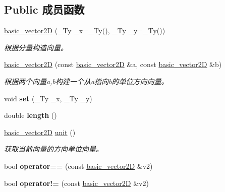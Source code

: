 \subsection*{Public 成员函数}
\begin{DoxyCompactItemize}
\item 
\hyperlink{structbasic__vector2_d_ad8b15c63d5ad6e86e1192ff820f53a67}{basic\+\_\+vector2D} (\+\_\+\+Ty \+\_\+x=\+\_\+\+Ty(), \+\_\+\+Ty \+\_\+y=\+\_\+\+Ty())
\begin{DoxyCompactList}\small\item\em 根据分量构造向量。 \end{DoxyCompactList}\item 
\hyperlink{structbasic__vector2_d_a348d37f966eeda40626112688649cb70}{basic\+\_\+vector2D} (const \hyperlink{structbasic__vector2_d}{basic\+\_\+vector2D} \&a, const \hyperlink{structbasic__vector2_d}{basic\+\_\+vector2D} \&b)
\begin{DoxyCompactList}\small\item\em 根据两个向量a,b构建一个从a指向b的单位方向向量。 \end{DoxyCompactList}\item 
\mbox{\label{structbasic__vector2_d_a4085ab29a73798d9a1958eef96bf5f33}} 
void {\bfseries set} (\+\_\+\+Ty \+\_\+x, \+\_\+\+Ty \+\_\+y)
\item 
\mbox{\label{structbasic__vector2_d_a9a5e3046e0e3c08caa6bc56e6cf2d270}} 
double {\bfseries length} ()
\item 
\hyperlink{structbasic__vector2_d}{basic\+\_\+vector2D} \hyperlink{structbasic__vector2_d_aa4b24c577ef24c814370beebc22f3bb8}{unit} ()
\begin{DoxyCompactList}\small\item\em 获取当前向量的方向单位向量。 \end{DoxyCompactList}\item 
\mbox{\label{structbasic__vector2_d_a51f3108036d2f3df7a4d5da488717d71}} 
bool {\bfseries operator==} (const \hyperlink{structbasic__vector2_d}{basic\+\_\+vector2D} \&v2)
\item 
\mbox{\label{structbasic__vector2_d_abd00075de4f4635651d57ede1800ad27}} 
bool {\bfseries operator!=} (const \hyperlink{structbasic__vector2_d}{basic\+\_\+vector2D} \&v2)
\item 

\end{DoxyCompactItemize}
